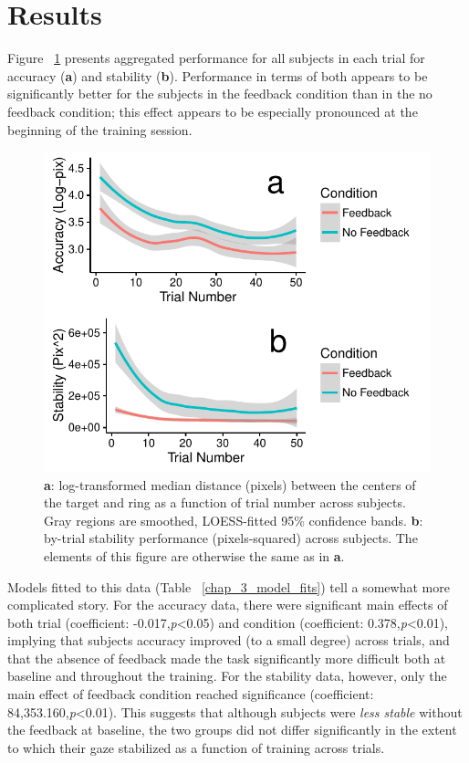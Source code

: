 \section{Results}

Figure ~\ref{chap_3_outcome_by_trial} presents aggregated performance for all subjects in each trial for accuracy (\textbf{a}) and stability (\textbf{b}). Performance in terms of both appears to be significantly better for the subjects in the feedback condition than in the no feedback condition; this effect appears to be especially pronounced at the beginning of the training session. 

\begin{figure}[htbp]
\centering
\includegraphics[width=.75\linewidth,height=.75\textheight,keepaspectratio]{figures/chapter_3/outcome_by_trial.pdf}
\caption[Experiment 3: Outcomes by Trial]{\textbf{a}: log-transformed median distance (pixels) between the centers of the target and ring as a function of trial number across subjects. Gray regions are smoothed, LOESS-fitted 95\% confidence bands. \textbf{b}: by-trial stability performance (pixels-squared) across subjects. The elements of this figure are otherwise the same as in \textbf{a}.}\label{chap_3_outcome_by_trial}
\end{figure}

Models fitted to this data (Table ~\ref{chap_3_model_fits}) tell a somewhat more complicated story. For the accuracy data, there were significant main effects of both trial (coefficient: -0.017,\textit{p}\textless0.05) and condition (coefficient: 0.378,\textit{p}\textless0.01), implying that subjects accuracy improved (to a small degree) across trials, and that the absence of feedback made the task significantly more difficult both at baseline and throughout the training. For the stability data, however, only the main effect of feedback condition reached significance (coefficient: 84,353.160,\textit{p}\textless0.01). This suggests that although subjects were \textit{less stable} without the feedback at baseline, the two groups did not differ significantly in the extent to which their gaze stabilized as a function of training across trials. 

